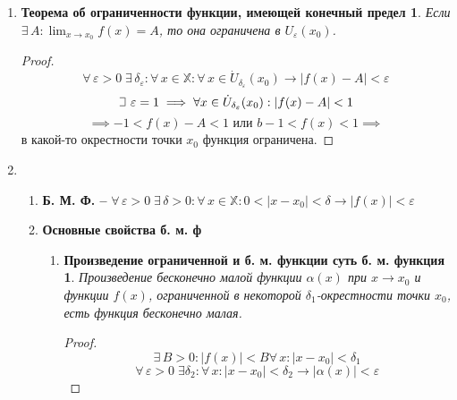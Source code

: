 \documentclass{article}
\theoremstyle{plain}
\def\letus{%
    \mathord{\setbox0=\hbox{$\exists$}%
             \hbox{\kern 0.125\wd0%
                   \vbox to \ht0{%
                      \hrule width 0.75\wd0%
                      \vfill%
                      \hrule width 0.75\wd0}%
                   \vrule height \ht0%
                   \kern 0.125\wd0}%
           }%
}
\begin{document}
\begin{enumerate}
\begin{enumerate}
\begin{proof}
                     $$\delta = \min{{\delta_{\varepsilon_1}, \delta_{\varepsilon_2}}}\;: \forall\, x \in \mathbb{X}\rightarrow 0 < |x - a| < \delta.$$
                     $$|\xi - \psi| \le |f(x) - \xi| + |f(x) - \psi| \le 2\varepsilon \implies$$
                     По \textbf{упрощай-лемме}: $|\xi - \psi| < \varepsilon,\; \varepsilon > 0 \implies \xi = \psi$.
            \end{proof}
        \end{enumerate}
        \item \newtheorem*{ogran*}{Теорема об ограниченности функции, имеющей конечный предел}
        \begin{ogran*}
        Если $\exists\, A: \lim_{x \to x_0}{f(x)} = A$, то она ограничена в $U_{\varepsilon}(x_0)$.
        \end{ogran*}
        \begin{proof}
               $$ \forall\, \varepsilon > 0\; \exists\, \delta_{\varepsilon}: \forall\, x \in \mathbb{X}: \forall\, x \in \dot{U}_{\delta_\varepsilon}(x_0) \rightarrow |f(x) - A| < \varepsilon$$
               $$\letus \,\, \varepsilon = 1\implies \forall x \in \dot{U}_{\delta_\varepsilon}(x_0): |f(x) - A| < 1$$
               $$\implies -1 < f(x) - A < 1 \text{ или } b - 1 < f(x) < 1\implies$$
               в какой-то окрестности точки $x_0$ функция ограничена.
        \end{proof}
        \item \begin{enumerate}
            \item \textbf{Б. М. Ф. -- } $\forall\,\varepsilon > 0 \; \exists\, \delta > 0: \forall\, x \in \mathbb{X}: 0 < |x - x_0| < \delta \rightarrow |f(x)| < \varepsilon$
            \item \textbf{Основные свойства б. м. ф}
            \begin{enumerate}
                \item \newtheorem*{prop1*}{Произведение ограниченной и б. м. функции суть б. м. функция}
                \begin{prop1*}
                Произведение бесконечно малой функции $\alpha(x)$ при $x \to x_0$ и функции $f(x)$, ограниченной в некоторой $\delta_1$-окрестности точки $x_0$, есть функция бесконечно малая.
                \end{prop1*}
                \begin{proof}
                            $$\exists \, B > 0: |f(x)| < B \forall\, x: |x - x_0| < \delta_1$$
                            $$\forall\,\varepsilon > 0\;\exists \delta_2: \forall\, x: |x - x_0| < \delta_2 \rightarrow |\alpha(x)| < \varepsilon$$

\end{proof}
\end{enumerate}
\end{enumerate}
\end{enumerate}
\end{document}
